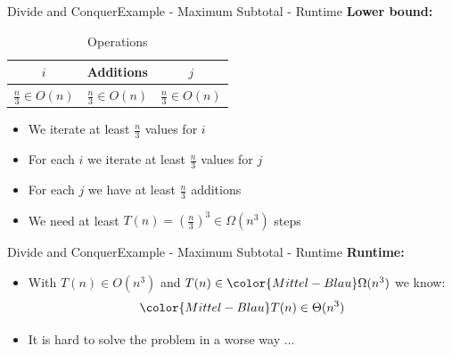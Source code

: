 \begin{frame}{Divide and Conquer}{Example - Maximum Subtotal - Runtime}
  \textbf{Lower bound:}
  \begin{table}
    \caption{Operations}
    \label{fig:divide_and_conquer:max_sub_total_operations}
    \begin{tabular}{c|c|c}
      $i$ & Additions & $j$\\
      \midrule
      $\frac{n}{3} \in O(n)$ &
      $\frac{n}{3} \in O(n)$ &
      $\frac{n}{3} \in O(n)$\\
    \end{tabular}
  \end{table}
  \begin{itemize}
    \item<2->
      We iterate at least {\color{Mittel-Blau}$\frac{n}{3}$} values for {\color{Mittel-Blau}$i$}
    \item<3->
      For each {\color{Mittel-Blau}$i$} we iterate at least {\color{Mittel-Blau}$\frac{n}{3}$} values for {\color{Mittel-Blau}$j$}
    \item<4->
      For each {\color{Mittel-Blau}$j$} we have at least {\color{Mittel-Blau}$\frac{n}{3}$} additions
    \item<5->
      We need at least {\color{Mittel-Blau}$T(n) = (\frac{n}{3})^3 \in \Omega(n^3)$} steps
  \end{itemize}
  
\end{frame}


\begin{frame}{Divide and Conquer}{Example - Maximum Subtotal - Runtime}
  \textbf{Runtime:}
  \begin{itemize}
    \item<2->
      With {\color{Mittel-Blau}$T(n) \in O(n^3)$} and
      $T(n) \in {\color{Mittel-Blau}\Omega(n^3)}$ we know:
      \begin{displaymath}
        \color{Mittel-Blau}
        T(n) \in \Theta(n^3)
      \end{displaymath}
    \item<3->
      It is hard to solve the problem in a worse way $\ldots$
  \end{itemize}
\end{frame}


